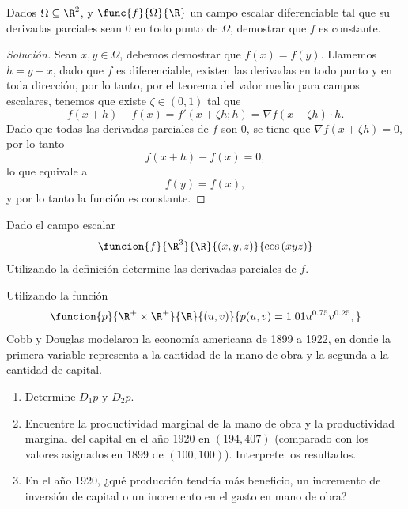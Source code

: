 \documentclass[a4,11pt]{aleph-notas}
\begin{document}
\encabezado

\begin{ejer}
Dados $\Omega\subseteq \R^2$, y $\func{f}{\Omega}{\R}$ un campo escalar diferenciable tal que su derivadas parciales sean 0 en todo punto de $\Omega$, demostrar que $f$ es constante.
\end{ejer}

\begin{proof}[Solución]
Sean $x,y\in \Omega$, debemos demostrar que $f(x)=f(y)$. Llamemos $h=y-x$, dado que $f$ es diferenciable, existen las derivadas en todo punto y en toda dirección, por lo tanto, por el teorema del valor medio para campos escalares, tenemos que existe $\zeta\in(0,1)$ tal que
    \[
        f(x+h)-f(x) = f'(x+\zeta h;h) = \nabla f(x+\zeta h)\cdot h.
    \]
    Dado que todas las derivadas parciales de $f$ son 0, se tiene que $\nabla f(x+\zeta h)=0$, por lo tanto
    \[
        f(x+h)-f(x)=0,
    \]
    lo que equivale a
    \[
        f(y)=f(x),
    \]
    y por lo tanto la función es constante.
\end{proof}

\begin{ejer}
Dado el campo escalar
    \[
        \funcion{f}{\R^3}{\R}{(x,y,z)}{\cos{(xyz)}}
    \]
    Utilizando la definición determine las derivadas parciales de $f$.
\end{ejer}

\begin{ejer}
Utilizando la función
    \[
        \funcion{p}{\R^{+}\times\R^{+}}{\R}{(u,v)}{p(u,v)=1.01u^{0.75}v^{0.25},}
    \]
    Cobb y Douglas modelaron la economía americana de 1899 a 1922, en donde la primera variable representa a la cantidad de la mano de obra y la segunda a la cantidad de capital.
    \begin{enumerate}
        \item Determine $D_1 p$ y $D_2 p$.
        \item Encuentre la productividad marginal de la mano de obra y la productividad marginal del capital en el año 1920 en $(194, 407)$ (comparado con los valores asignados en 1899 de $(100,100)$). Interprete los resultados.
        \item En el año 1920, ¿qué producción tendría más beneficio, un incremento de inversión de capital o un incremento en el gasto en mano de obra?
    \end{enumerate}
\end{ejer}
\end{document}

